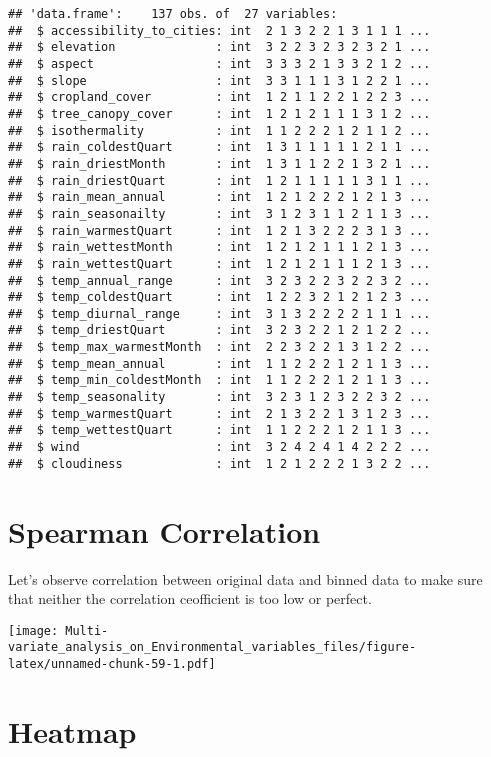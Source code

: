 \documentclass[]{book}
\begin{document}
\begin{verbatim}
## 'data.frame':    137 obs. of  27 variables:
##  $ accessibility_to_cities: int  2 1 3 2 2 1 3 1 1 1 ...
##  $ elevation              : int  3 2 2 3 2 3 2 3 2 1 ...
##  $ aspect                 : int  3 3 3 2 1 3 3 2 1 2 ...
##  $ slope                  : int  3 3 1 1 1 3 1 2 2 1 ...
##  $ cropland_cover         : int  1 2 1 1 2 2 1 2 2 3 ...
##  $ tree_canopy_cover      : int  1 2 1 2 1 1 1 3 1 2 ...
##  $ isothermality          : int  1 1 2 2 2 1 2 1 1 2 ...
##  $ rain_coldestQuart      : int  1 3 1 1 1 1 1 2 1 1 ...
##  $ rain_driestMonth       : int  1 3 1 1 2 2 1 3 2 1 ...
##  $ rain_driestQuart       : int  1 2 1 1 1 1 1 3 1 1 ...
##  $ rain_mean_annual       : int  1 2 1 2 2 2 1 2 1 3 ...
##  $ rain_seasonailty       : int  3 1 2 3 1 1 2 1 1 3 ...
##  $ rain_warmestQuart      : int  1 2 1 3 2 2 2 3 1 3 ...
##  $ rain_wettestMonth      : int  1 2 1 2 1 1 1 2 1 3 ...
##  $ rain_wettestQuart      : int  1 2 1 2 1 1 1 2 1 3 ...
##  $ temp_annual_range      : int  3 2 3 2 2 3 2 2 3 2 ...
##  $ temp_coldestQuart      : int  1 2 2 3 2 1 2 1 2 3 ...
##  $ temp_diurnal_range     : int  3 1 3 2 2 2 2 1 1 1 ...
##  $ temp_driestQuart       : int  3 2 3 2 2 1 2 1 2 2 ...
##  $ temp_max_warmestMonth  : int  2 2 3 2 2 1 3 1 2 2 ...
##  $ temp_mean_annual       : int  1 1 2 2 2 1 2 1 1 3 ...
##  $ temp_min_coldestMonth  : int  1 1 2 2 2 1 2 1 1 3 ...
##  $ temp_seasonality       : int  3 2 3 1 2 3 2 2 3 2 ...
##  $ temp_warmestQuart      : int  2 1 3 2 2 1 3 1 2 3 ...
##  $ temp_wettestQuart      : int  1 1 2 2 2 1 2 1 1 3 ...
##  $ wind                   : int  3 2 4 2 4 1 4 2 2 2 ...
##  $ cloudiness             : int  1 2 1 2 2 2 1 3 2 2 ...
\end{verbatim}

\hypertarget{spearman-correlation-1}{%
\section{Spearman Correlation}\label{spearman-correlation-1}}

Let's observe correlation between original data and binned data to make
sure that neither the correlation ceofficient is too low or perfect.

\texttt{[image: Multi-variate\_analysis\_on\_Environmental\_variables\_files/figure-latex/unnamed-chunk-59-1.pdf]}

\hypertarget{heatmap-2}{%
\section{Heatmap}\label{heatmap-2}}
\end{document}
